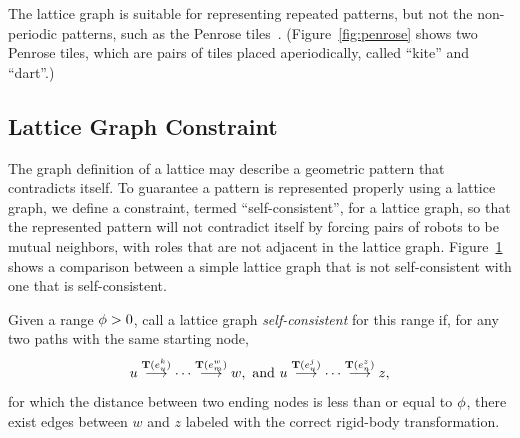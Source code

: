 The lattice graph is suitable for representing repeated patterns, but not the non-periodic patterns, 
such as the Penrose tiles~\cite{Pen79, Gum96}. 
(Figure~\ref{fig:penrose} shows two Penrose tiles, which are pairs of tiles placed aperiodically, called ``kite'' and ``dart''.)


\subsection{Lattice Graph Constraint}
The graph definition of a lattice may describe a geometric pattern that contradicts itself. 
To guarantee a pattern is represented properly using a lattice graph, we define a constraint, termed ``self-consistent'', for a lattice graph, so that the represented pattern will not contradict itself by forcing pairs of robots to be mutual neighbors, with roles that are not adjacent in the lattice graph. 
%
Figure~\ref{fig:self-consistent-graph} shows a comparison between a simple
lattice graph that is not self-consistent with one that is self-consistent.



\begin{defn}
  \label{def:selfconsistent}
  Given a range $\phi > 0$, call a lattice graph \textit{self-consistent} for
  this range if, for any two paths with the same starting node,
  $$ {u}\overset{\mathbf{T}(e_u^{k})}{\longrightarrow}{\cdots}\overset{\mathbf{T}(e_m^{w})}{\longrightarrow}{w}, \mbox{ and } 
    {u}\overset{\mathbf{T}(e_u^{j})}{\longrightarrow}{\cdots}\overset{\mathbf{T}(e_n^{z})}{\longrightarrow}{z}, $$
  for which the distance between two ending nodes is less than or equal to
  $\phi$, there exist edges between $w$ and $z$ labeled with the correct rigid-body transformation.
\end{defn}


\begin{figure}
    \centering
    
    \label{fig:self-consistent-graph}
\end{figure}


